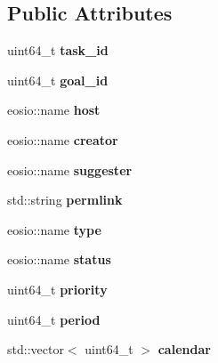 \subsection*{Public Attributes}
\begin{DoxyCompactItemize}
\item 
\mbox{\label{structtasks_ad4b311db95eda69f6aaf6cd511bea146}} 
uint64\+\_\+t {\bfseries task\+\_\+id}
\item 
\mbox{\label{structtasks_aa4501a330653e176762f809b7d84647d}} 
uint64\+\_\+t {\bfseries goal\+\_\+id}
\item 
\mbox{\label{structtasks_a9adf310986b0b821249916c5d44e97b9}} 
eosio\+::name {\bfseries host}
\item 
\mbox{\label{structtasks_a9c551795c1cdbde451c03705f9f2174b}} 
eosio\+::name {\bfseries creator}
\item 
\mbox{\label{structtasks_a9febb6a0d6b990f4773496a203d1a9e2}} 
eosio\+::name {\bfseries suggester}
\item 
\mbox{\label{structtasks_a065f2d917e382346cd89e2f77e95472d}} 
std\+::string {\bfseries permlink}
\item 
\mbox{\label{structtasks_a631f3185010ccc1fc833173335274a03}} 
eosio\+::name {\bfseries type}
\item 
\mbox{\label{structtasks_acaadd6e375352b79fae8b9e223aee032}} 
eosio\+::name {\bfseries status}
\item 
\mbox{\label{structtasks_a5d233f233b15ab37116b60b28d19a189}} 
uint64\+\_\+t {\bfseries priority}
\item 
\mbox{\label{structtasks_a8a1e1f26225f2eb6b7644f0760c8fbc2}} 
uint64\+\_\+t {\bfseries period}
\item 
\mbox{\label{structtasks_a830005fe1a99e6c57bf8a1205868fdcf}} 
std\+::vector$<$ uint64\+\_\+t $>$ {\bfseries calendar}
\item 
\mbox{\label{structtasks_ab67682b429b14eb0102cbabf586f2542}} 

\end{DoxyCompactItemize}
